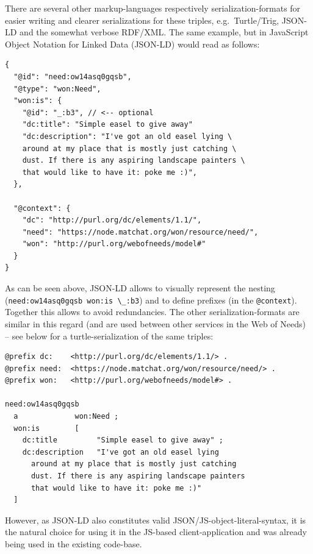 \documentclass[a4paper,,tablecaptionabove]{scrbook}
\newcommand{\passthrough}[1]{#1}
\begin{document}
There are several other markup-languages respectively
serialization-formats for easier writing and clearer serializations for
these triples, e.g.~Turtle/Trig, JSON-LD and the somewhat verbose
RDF/XML. The same example, but in JavaScript Object Notation for Linked
Data (JSON-LD) would read as follows:

\begin{lstlisting}[caption={Excerpt of a need description (JSON-LD)}, label=fig:needjson]
{
  "@id": "need:ow14asq0gqsb",
  "@type": "won:Need",
  "won:is": {
    "@id": "_:b3", // <-- optional
    "dc:title": "Simple easel to give away"
    "dc:description": "I've got an old easel lying \
    around at my place that is mostly just catching \
    dust. If there is any aspiring landscape painters \
    that would like to have it: poke me :)",
  },

  "@context": {
    "dc": "http://purl.org/dc/elements/1.1/",
    "need": "https://node.matchat.org/won/resource/need/",
    "won": "http://purl.org/webofneeds/model#"
  }
}
\end{lstlisting}

As can be seen above, JSON-LD allows to visually represent the nesting
(\passthrough{\lstinline!need:ow14asq0gqsb won:is \_:b3!}) and to define
prefixes (in the \passthrough{\lstinline!@context!}). Together this
allows to avoid redundancies. The other serialization-formats are
similar in this regard (and are used between other services in the Web
of Needs) -- see below for a turtle-serialization of the same triples:

\begin{lstlisting}[caption={Excerpt of a need description (TTL)}, label=fig:needttl]
@prefix dc:    <http://purl.org/dc/elements/1.1/> .
@prefix need:  <https://node.matchat.org/won/resource/need/> .
@prefix won:   <http://purl.org/webofneeds/model#> .

need:ow14asq0gqsb
  a             won:Need ;
  won:is        [
    dc:title         "Simple easel to give away" ;
    dc:description   "I've got an old easel lying
      around at my place that is mostly just catching
      dust. If there is any aspiring landscape painters
      that would like to have it: poke me :)"
  ]
\end{lstlisting}

However, as JSON-LD also constitutes valid
JSON/JS-object-literal-syntax, it is the natural choice for using it in
the JS-based client-application and was already being used in the
existing code-base.
\end{document}
